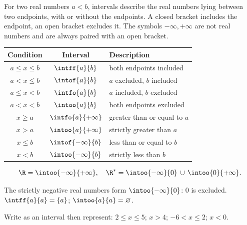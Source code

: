 \begin{keypoint}[Notation]
For two real numbers $a<b$, intervals describe the real numbers lying between two endpoints, with or without the endpoints. A closed bracket includes the endpoint, an open bracket excludes it. The symbols $-\infty,+\infty$ are not real numbers and are always paired with an open bracket.
\end{keypoint}
\begin{center}\begin{tabular}{c|c|l}
\textbf{Condition}&\textbf{Interval}&\textbf{Description}\\\hline
$a\leq x\leq b$&$\intff{a}{b}$&both endpoints included\\
$a<x\leq b$&$\intof{a}{b}$&$a$ excluded, $b$ included\\
$a\leq x<b$&$\intfo{a}{b}$&$a$ included, $b$ excluded\\
$a<x<b$&$\intoo{a}{b}$&both endpoints excluded\\
$x\geq a$&$\intfo{a}{+\infty}$&greater than or equal to $a$\\
$x>a$&$\intoo{a}{+\infty}$&strictly greater than $a$\\
$x\leq b$&$\intof{-\infty}{b}$&less than or equal to $b$\\
$x<b$&$\intoo{-\infty}{b}$&strictly less than $b$
\end{tabular}\end{center}
\[\R=\intoo{-\infty}{+\infty},\quad \R^*=\intoo{-\infty}{0}\,\cup\,\intoo{0}{+\infty}.\]
\begin{pitfall}The strictly negative real numbers form $\intoo{-\infty}{0}$: $0$ is excluded. $\intff{a}{a}=\{a\}$; $\intoo{a}{a}=\varnothing$.\end{pitfall}
\begin{example}Write as an interval then represent: $2\leq x\leq5$; $x>4$; $-6<x\leq2$; $x<0$.\end{example}

